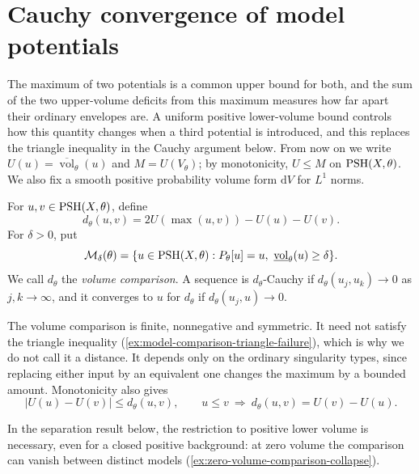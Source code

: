 

\section{Cauchy convergence of model potentials}
\label{sec:model-volume-comparison}

The maximum of two potentials is a common upper bound for both, and the sum of the two upper-volume deficits from this maximum measures how far apart their ordinary envelopes are. A uniform positive lower-volume bound controls how this quantity changes when a third potential is introduced, and this replaces the triangle inequality in the Cauchy argument below. From now on we write $U(u)=\overline{\operatorname{vol}}_\theta(u)$ and $M=U(V_\theta)$; by monotonicity, $U\leq M$ on $\mathrm{PSH}(X,\theta)$. We also fix a smooth positive probability volume form $\mathrm{d}V$ for $L^1$ norms.

\begin{definition}\label{def:model-volume-comparison}
For $u,v\in\mathrm{PSH}(X,\theta)$, define
\[
 d_\theta(u,v)=2U(\max(u,v))-U(u)-U(v).
\]
For $\delta>0$, put
\[
 \mathcal M_\delta(\theta)=
 \{u\in\mathrm{PSH}(X,\theta):P_\theta[u]=u,
       \ \underline{\operatorname{vol}}_\theta(u)\geq\delta\}.
\]
We call $d_\theta$ the \emph{volume comparison}. A sequence is $d_\theta$-Cauchy if $d_\theta(u_j,u_k)\to0$ as $j,k\to\infty$, and it converges to $u$ for $d_\theta$ if $d_\theta(u_j,u)\to0$.
\end{definition}

The volume comparison is finite, nonnegative and symmetric. It need not satisfy the triangle inequality (\cref{ex:model-comparison-triangle-failure}), which is why we do not call it a distance. It depends only on the ordinary singularity types, since replacing either input by an equivalent one changes the maximum by a bounded amount. Monotonicity also gives
\begin{equation}\label{eq:volume-comparison-basic}
 |U(u)-U(v)|\leq d_\theta(u,v),\qquad
 u\leq v\ \Longrightarrow\ d_\theta(u,v)=U(v)-U(u).
\end{equation}

In the separation result below, the restriction to positive lower volume is necessary, even for a closed positive background: at zero volume the comparison can vanish between distinct models (\cref{ex:zero-volume-comparison-collapse}).

